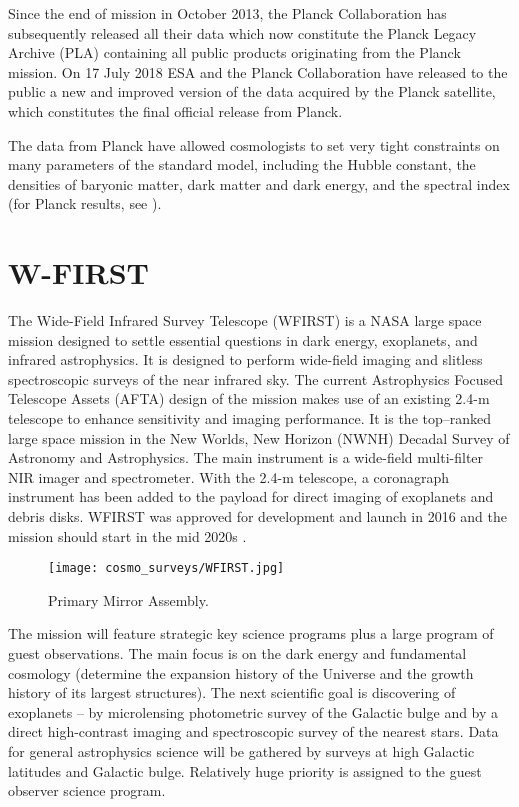 Since the end of mission in October 2013, the Planck Collaboration has subsequently released all their data which now constitute the Planck Legacy Archive (PLA) containing all public products originating from the Planck mission. On 17 July 2018 ESA and the Planck Collaboration have released to the public a new and improved version of the data acquired by the Planck satellite, which constitutes the final official release from Planck.

The data from Planck have allowed cosmologists to set very tight constraints on many parameters of the standard model, including the Hubble constant, the densities of baryonic matter, dark matter and dark energy, and the spectral index (for Planck results, see \cite{planck_cosm}).
\section{W-FIRST}
The Wide-Field Infrared Survey Telescope (WFIRST) is a NASA large space mission designed to settle essential questions in dark energy, exoplanets, and infrared astrophysics. It is designed to perform wide-field imaging and slitless spectroscopic surveys of the near infrared sky. The current Astrophysics Focused Telescope Assets (AFTA) design of the mission makes use of an existing 2.4-m telescope to enhance sensitivity and imaging performance. It is the top--ranked large space mission in the New Worlds, New Horizon (NWNH) Decadal Survey of Astronomy and Astrophysics. The main instrument is a wide-field multi-filter NIR imager and spectrometer. With the 2.4-m telescope, a coronagraph instrument has been added to the payload for direct imaging of exoplanets and debris disks. WFIRST was approved for development and launch in 2016 and the mission should start in the mid 2020s \cite{WFIRST_report}.

\begin{figure}[htb]
    \centering
    \texttt{[image: cosmo\_surveys/WFIRST.jpg]}
    \caption{Primary Mirror Assembly.}
    \label{fig:wfirst}
\end{figure}
The mission will feature strategic key science programs plus a large program of guest observations. The main focus is on the dark energy and fundamental cosmology (determine the expansion history of the Universe and the growth history of its largest structures). The next scientific goal is discovering of exoplanets -- by microlensing photometric survey of the Galactic bulge and by a direct high-contrast imaging and spectroscopic survey of the nearest stars. Data for general astrophysics science will be gathered by surveys at high Galactic latitudes and Galactic bulge. Relatively huge priority is assigned to the guest observer science program.

